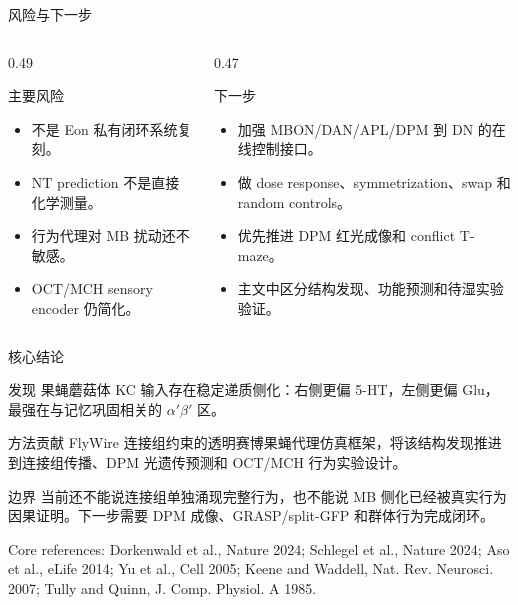 \documentclass[aspectratio=169,10pt,fontset=none]{ctexbeamer}
\newcommand{\refs}[1]{\vfill{\tiny\textcolor{FlyDark}{#1}}}
\begin{document}
\begin{frame}{风险与下一步}
\small
\begin{columns}[T,onlytextwidth]
  \begin{column}{0.49\textwidth}
    \begin{block}{主要风险}
      \begin{itemize}
        \item 不是 Eon 私有闭环系统复刻。
        \item NT prediction 不是直接化学测量。
        \item 行为代理对 MB 扰动还不敏感。
        \item OCT/MCH sensory encoder 仍简化。
      \end{itemize}
    \end{block}
  \end{column}
  \begin{column}{0.47\textwidth}
    \begin{block}{下一步}
      \begin{itemize}
        \item 加强 MBON/DAN/APL/DPM 到 DN 的在线控制接口。
        \item 做 dose response、symmetrization、swap 和 random controls。
        \item 优先推进 DPM 红光成像和 conflict T-maze。
        \item 主文中区分结构发现、功能预测和待湿实验验证。
      \end{itemize}
    \end{block}
  \end{column}
\end{columns}
\end{frame}

\begin{frame}{核心结论}
\small
\begin{block}{发现}
果蝇蘑菇体 KC 输入存在稳定递质侧化：右侧更偏 5-HT，左侧更偏 Glu，最强在与记忆巩固相关的 $\alpha'\beta'$ 区。
\end{block}
\begin{block}{方法贡献}
FlyWire 连接组约束的透明赛博果蝇代理仿真框架，将该结构发现推进到连接组传播、DPM 光遗传预测和 OCT/MCH 行为实验设计。
\end{block}
\begin{alertblock}{边界}
当前还不能说连接组单独涌现完整行为，也不能说 MB 侧化已经被真实行为因果证明。下一步需要 DPM 成像、GRASP/split-GFP 和群体行为完成闭环。
\end{alertblock}
\refs{Core references: Dorkenwald et al., Nature 2024; Schlegel et al., Nature 2024; Aso et al., eLife 2014; Yu et al., Cell 2005; Keene and Waddell, Nat. Rev. Neurosci. 2007; Tully and Quinn, J. Comp. Physiol. A 1985.}
\end{frame}
\end{document}
